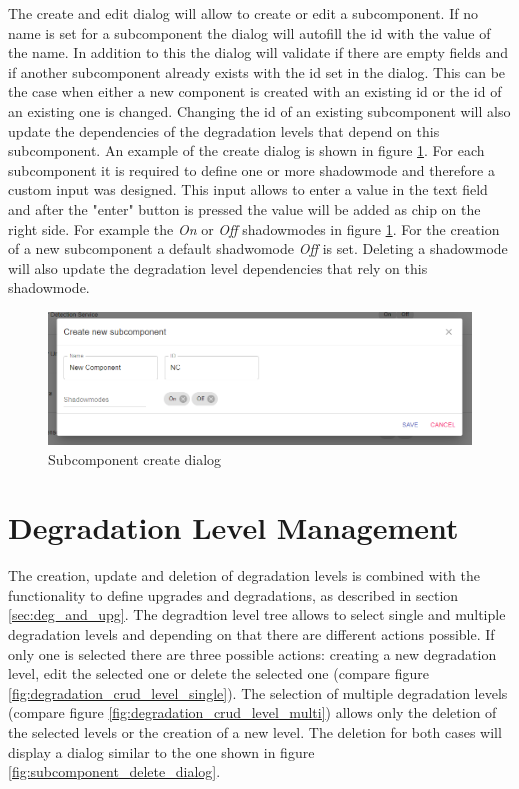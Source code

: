 The create and edit dialog will allow to create or edit a subcomponent. If no name is set for a subcomponent the dialog will autofill the id with the value of the name. In addition to this the dialog will validate if there are empty fields and if another subcomponent already exists with the id set in the dialog. This can be the case when either a new component is created with an existing id or the id of an existing one is changed. Changing the id of an existing subcomponent will also update the dependencies of the degradation levels that depend on this subcomponent. An example of the create dialog is shown in figure \ref{fig:subcomponent_create_dialog}. For each subcomponent it is required to define one or more shadowmode and therefore a custom input was designed. This input allows to enter a value in the text field and after the "enter" button is pressed the value will be added as chip on the right side. For example the \textit{On} or \textit{Off} shadowmodes in figure \ref{fig:subcomponent_create_dialog}. For the creation of a new subcomponent a default shadwomode \textit{Off} is set. Deleting a shadowmode will also update the degradation level dependencies that rely on this shadowmode.

\begin{figure}[ht]
    \centering
    \includegraphics[width=\textwidth]{img/subcomponents_create.png}
    \caption{Subcomponent create dialog}
    \label{fig:subcomponent_create_dialog}
\end{figure}

\section{Degradation Level Management}
The creation, update and deletion of degradation levels is combined with the functionality to define upgrades and degradations, as described in section \ref{sec:deg_and_upg}. The degradtion level tree allows to select single and multiple degradation levels and depending on that there are different actions possible. If only one is selected there are three possible actions: creating a new degradation level, edit the selected one or delete the selected one (compare figure \ref{fig:degradation_crud_level_single}). The selection of multiple degradation levels (compare figure \ref{fig:degradation_crud_level_multi}) allows only the deletion of the selected levels or the creation of a new level. The deletion for both cases will display a dialog similar to the one shown in figure \ref{fig:subcomponent_delete_dialog}.

